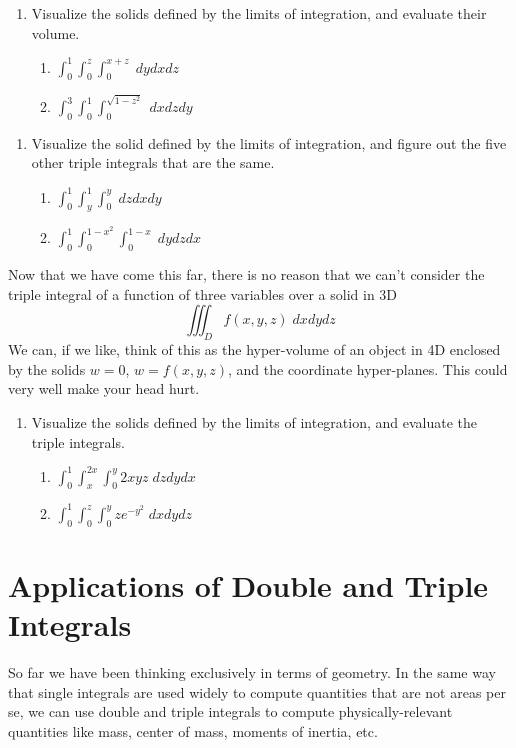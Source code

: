 \documentclass{tufte-handout}
\begin{document}
\begin{enumerate}[resume]
\item Visualize the solids defined by the limits of integration, and evaluate their volume.
\begin{enumerate}
\item $\int_0^1 \int_0^z \int_0^{x+z} \; dy dx dz$
\item $\int_0^3 \int_0^1 \int_0^{\sqrt{1-z^2}} \; dx dz dy$
\end{enumerate}
\end{enumerate}

\begin{enumerate}[resume]
\item Visualize the solid defined by the limits of integration, and figure out the five other triple integrals that are the same.
\begin{enumerate}
\item $\int_0^1 \int_y^1 \int_0^y \; dz dx dy$
\item $\int_0^1 \int_0^{1-x^2} \int_0^{1-x} \; dy dz dx$
\end{enumerate}
\end{enumerate}

Now that we have come this far, there is no reason that we can't consider the triple integral of a function of three variables over a solid in 3D
\[\iiint_D f (x,y,z) \; dx dy dz \]
We can, if we like, think of this as the hyper-volume of an object in 4D enclosed by the solids $w=0$, $w=f(x,y,z)$, and the coordinate hyper-planes. This could very well make your head hurt.

\begin{enumerate}[resume]
\item Visualize the solids defined by the limits of integration, and evaluate the triple integrals.
\begin{enumerate}
\item $\int_0^1 \int_x^{2x} \int_0^y 2xyz \; dz dy dx$
\item $\int_0^1 \int_0^z \int_0^y z e^{-y^2} \; dx dy dz$
\end{enumerate}
\end{enumerate}

\section{Applications of Double and Triple Integrals}

So far we have been thinking exclusively in terms of geometry. In the same way that single integrals are used widely to compute quantities that are not areas per se, we can use double and triple integrals to compute physically-relevant quantities like mass, center of mass, moments of inertia, etc. 
\end{document}
